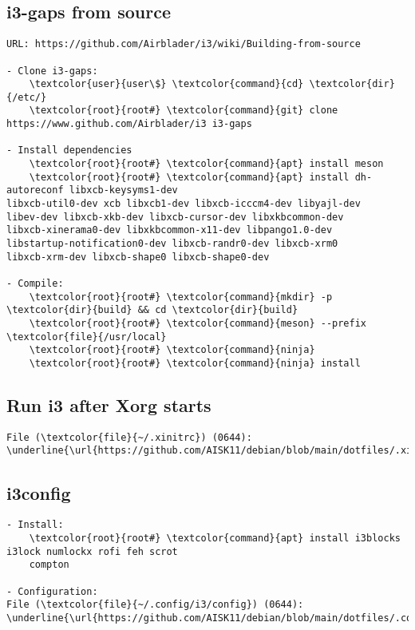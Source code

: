 \documentclass[10pt, a4paper, onecolumn, openany]{book} %
\begin{document}
\subsection{i3-gaps from source}
\begin{Verbatim}[commandchars=\\\{\}]
URL: https://github.com/Airblader/i3/wiki/Building-from-source

- Clone i3-gaps:
    \textcolor{user}{user\$} \textcolor{command}{cd} \textcolor{dir}{/etc/}
    \textcolor{root}{root#} \textcolor{command}{git} clone https://www.github.com/Airblader/i3 i3-gaps

- Install dependencies
    \textcolor{root}{root#} \textcolor{command}{apt} install meson
    \textcolor{root}{root#} \textcolor{command}{apt} install dh-autoreconf libxcb-keysyms1-dev 
libxcb-util0-dev xcb libxcb1-dev libxcb-icccm4-dev libyajl-dev
libev-dev libxcb-xkb-dev libxcb-cursor-dev libxkbcommon-dev 
libxcb-xinerama0-dev libxkbcommon-x11-dev libpango1.0-dev
libstartup-notification0-dev libxcb-randr0-dev libxcb-xrm0 
libxcb-xrm-dev libxcb-shape0 libxcb-shape0-dev

- Compile:
    \textcolor{root}{root#} \textcolor{command}{mkdir} -p \textcolor{dir}{build} && cd \textcolor{dir}{build}
    \textcolor{root}{root#} \textcolor{command}{meson} --prefix \textcolor{file}{/usr/local}
    \textcolor{root}{root#} \textcolor{command}{ninja}
    \textcolor{root}{root#} \textcolor{command}{ninja} install
\end{Verbatim}

\subsection{Run i3 after Xorg starts}
\begin{Verbatim}[commandchars=\\\{\}]
File (\textcolor{file}{~/.xinitrc}) (0644):
\underline{\url{https://github.com/AISK11/debian/blob/main/dotfiles/.xinitrc}}
\end{Verbatim}
\subsection{i3config}
\begin{Verbatim}[commandchars=\\\{\}]
- Install:
    \textcolor{root}{root#} \textcolor{command}{apt} install i3blocks i3lock numlockx rofi feh scrot
    compton
    
- Configuration:
File (\textcolor{file}{~/.config/i3/config}) (0644):
\underline{\url{https://github.com/AISK11/debian/blob/main/dotfiles/.config/i3/config}}
\end{Verbatim}
\end{document}
